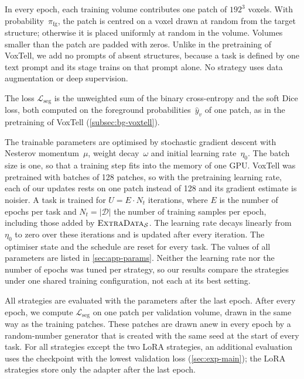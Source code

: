 In every epoch, each training volume contributes one patch of $192^3$ voxels.
With probability~$\pi_{\mathrm{fg}}$, the patch is centred on a voxel drawn at random from the target structure; otherwise it is placed uniformly at random in the volume.
Volumes smaller than the patch are padded with zeros.
Unlike in the pretraining of VoxTell, we add no prompts of absent structures, because a task is defined by one text prompt and its stage trains on that prompt alone.
No strategy uses data augmentation or deep supervision.

The loss $\mathcal{L}_{\mathrm{seg}}$ is the unweighted sum of the binary cross-entropy and the soft Dice loss, both computed on the foreground probabilities~$\hat{y}_v$ of one patch, as in the pretraining of VoxTell (\cref{subsec:bg-voxtell}).

The trainable parameters are optimised by stochastic gradient descent with Nesterov momentum~$\mu$, weight decay~$\omega$ and initial learning rate~$\eta_0$.
The batch size is one, so that a training step fits into the memory of one GPU.
VoxTell was pretrained with batches of 128 patches, so with the pretraining learning rate, each of our updates rests on one patch instead of 128 and its gradient estimate is noisier.
A task is trained for $U = E \cdot N_t$ iterations, where $E$ is the number of epochs per task and $N_t = |\mathcal{D}|$ the number of training samples per epoch, including those added by $\textsc{ExtraData}_{\mathcal{S}}$.
The learning rate decays linearly from~$\eta_0$ to zero over these iterations and is updated after every iteration.
The optimiser state and the schedule are reset for every task.
The values of all parameters are listed in \cref{sec:app-params}.
Neither the learning rate nor the number of epochs was tuned per strategy, so our results compare the strategies under one shared training configuration, not each at its best setting.

All strategies are evaluated with the parameters after the last epoch.
After every epoch, we compute $\mathcal{L}_{\mathrm{seg}}$ on one patch per validation volume, drawn in the same way as the training patches.
These patches are drawn anew in every epoch by a random-number generator that is created with the same seed at the start of every task.
For all strategies except the two LoRA strategies, an additional evaluation uses the checkpoint with the lowest validation loss (\cref{sec:exp-main}); the LoRA strategies store only the adapter after the last epoch.

